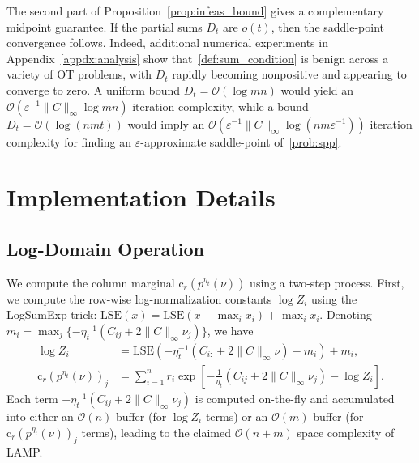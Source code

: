 \documentclass[10pt]{article}
\newcommand{\LSE}{\mathrm{LSE}}
\theoremstyle{plain}
\theoremstyle{definition}
\theoremstyle{remark}
\newcommand{\col}{\bm{\mathrm{c}}}
\begin{document}
The second part of Proposition~\ref{prop:infeas_bound} gives a complementary midpoint guarantee. If the partial sums $D_t$ are $o(t)$, then the saddle-point convergence follows. Indeed, additional numerical experiments in Appendix~\ref{appdx:analysis} show that~\eqref{def:sum_condition} is benign across a variety of OT problems, with $D_t$ rapidly becoming nonpositive and appearing to converge to zero. A uniform bound $D_t=\mathcal{O}(\log mn)$ would yield an $\mathcal{O}(\varepsilon^{-1}\|C\|_\infty\log mn)$
iteration complexity, while a bound $D_t=\mathcal{O}(\log(nmt))$ would imply
an $\mathcal{O}(\varepsilon^{-1} \|C\|_\infty \log(nm\varepsilon^{-1}))$ iteration complexity for
finding an $\varepsilon$-approximate saddle-point of~\eqref{prob:spp}. 

\section{Implementation Details}\label{sec:implementation}


\subsection{Log-Domain Operation}\label{ssec:log_domain}
 We compute the column marginal $\col_r(p^{\eta_t}(\nu))$ using a two-step process. First, we compute the row-wise log-normalization constants $\log Z_i$ using the LogSumExp trick: $\LSE(x)=\LSE(x-\max_ix_i)+\max_ix_i$. Denoting $m_i=\max_j\{-\eta_t^{-1}(C_{ij}+2\|C\|_\infty\nu_{j})\}$, we have
\begin{align*}
    \log Z_i &= \LSE(-\eta_t^{-1}(C_{i:}+2\|C\|_\infty\nu)-m_i) + m_i,\\
    \col_r(p^{\eta_t}(\nu))_j&=\sum_{i=1}^n r_i\exp\left[-\frac1{\eta_t}(C_{ij}+2\|C\|_\infty\nu_{j})-\log Z_i\right].
\end{align*}
Each term $-\eta_t^{-1}(C_{ij}+2\|C\|_\infty\nu_{j})$ is computed on-the-fly and accumulated into either an $\mathcal{O}(n)$ buffer (for $\log Z_i$ terms) or an $\mathcal{O}(m)$ buffer (for $\col_r(p^{\eta_t}(\nu))_j$ terms), leading to the claimed $\mathcal{O}(n+m)$ space complexity of LAMP. 
\end{document}
